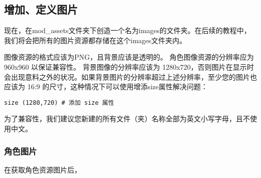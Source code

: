 \subsection{增加、定义图片}

现在，在mod\_assets文件夹下创造一个名为images的文件夹。在后续的教程中，我们将会把所有的图片资源都存储在这个images文件夹内。

\begin{Warning}
图像资源的格式应该为PNG，且背景应该是透明的。
角色图像资源的分辨率应为 960x960 以保证兼容性。
背景图像的分辨率应该为 1280x720，否则图片在显示时会出现意料之外的状况。如果背景图片的分辨率超过上述分辨率，至少您的图片也应该为 16:9 的尺寸，这种情况下可以使用增添size属性解决问题：

\begin{lstlisting}
size (1280,720) # 添加 size 属性
\end{lstlisting}

为了兼容性，我们建议您新建的所有文件（夹）名称全部为英文小写字母，且不使用中文。
\end{Warning}

\subsubsection{角色图片}

在获取角色资源图片后，
